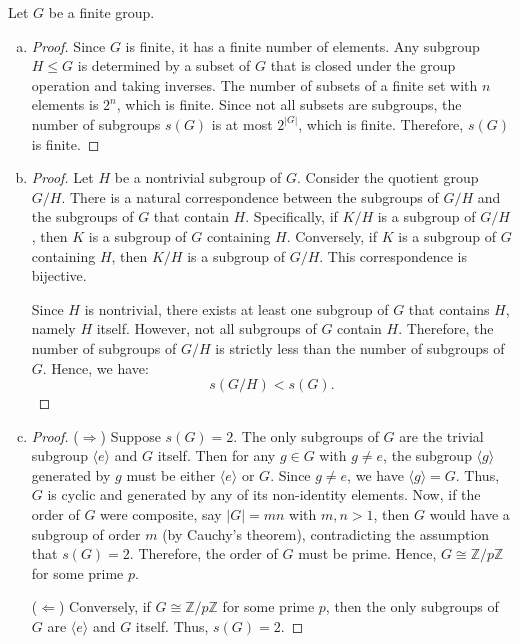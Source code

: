 \documentclass{article}
\def\zz{{\mathbb Z}}
\begin{document}
Let $G$ be a finite group.
\begin{enumerate}[(a)]
    \item \begin{proof}
        Since $G$ is finite, it has a finite number of elements. Any subgroup $H \leq G$ is determined by a subset of $G$ that is closed under the group operation and taking inverses. The number of subsets of a finite set with $n$ elements is $2^n$, which is finite. Since not all subsets are subgroups, the number of subgroups $s(G)$ is at most $2^{|G|}$, which is finite. Therefore, $s(G)$ is finite.
    \end{proof}
    \item \begin{proof}
        Let $H$ be a nontrivial subgroup of $G$. Consider the quotient group $G/H$. There is a natural correspondence between the subgroups of $G/H$ and the subgroups of $G$ that contain $H$. Specifically, if $K/H$ is a subgroup of $G/H$, then $K$ is a subgroup of $G$ containing $H$. Conversely, if $K$ is a subgroup of $G$ containing $H$, then $K/H$ is a subgroup of $G/H$. This correspondence is bijective.

        Since $H$ is nontrivial, there exists at least one subgroup of $G$ that contains $H$, namely $H$ itself. However, not all subgroups of $G$ contain $H$. Therefore, the number of subgroups of $G/H$ is strictly less than the number of subgroups of $G$. Hence, we have:
        \[
        s(G/H) < s(G).
        \]
    \end{proof}
    \item \begin{proof}
        ($\Rightarrow$) Suppose $s(G) = 2$. The only subgroups of $G$ are the trivial subgroup $\langle e\rangle$ and $G$ itself. Then for any $g \in G$ with $g \neq e$, the subgroup $\langle g \rangle$ generated by $g$ must be either $\langle e \rangle$ or $G$. Since $g \neq e$, we have $\langle g \rangle = G$. Thus, $G$ is cyclic and generated by any of its non-identity elements. Now, if the order of $G$ were composite, say $|G| = mn$ with $m, n > 1$, then $G$ would have a subgroup of order $m$ (by Cauchy's theorem), contradicting the assumption that $s(G) = 2$. Therefore, the order of $G$ must be prime. Hence, $G \cong \zz/p\zz$ for some prime $p$.

        ($\Leftarrow$) Conversely, if $G \cong \zz/p\zz$ for some prime $p$, then the only subgroups of $G$ are $\langle e\rangle$ and $G$ itself. Thus, $s(G) = 2$.
        

\end{proof}
\end{enumerate}
\end{document}
